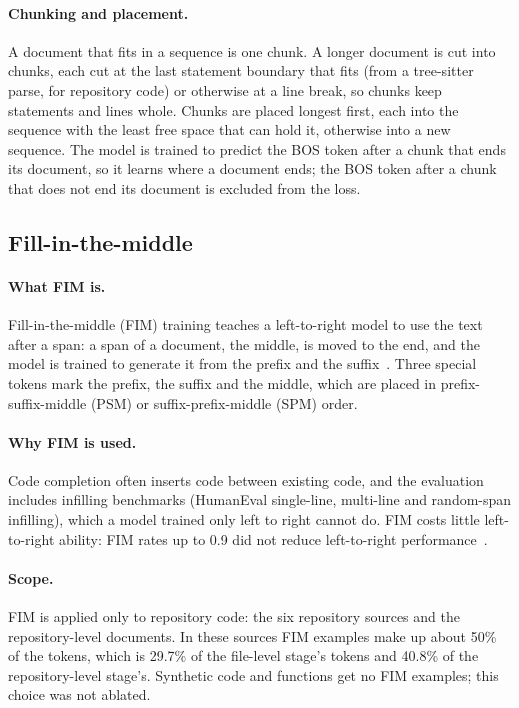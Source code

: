 \documentclass[sigconf,nonacm,balance=false]{acmart}
\begin{document}
\paragraph{Chunking and placement.} A document that fits in a sequence is one chunk. A longer document is cut into
chunks, each cut at the last statement boundary that fits (from a tree-sitter parse, for repository code) or otherwise
at a line break, so chunks keep statements and lines whole. Chunks are placed longest first, each into the sequence
with the least free space that can hold it, otherwise into a new sequence. The model is trained to predict the BOS
token after a chunk that ends its document, so it learns where a document ends; the BOS token after a chunk that does
not end its document is excluded from the loss.

\subsection{Fill-in-the-middle}
\label{sec:fim}

\paragraph{What FIM is.} Fill-in-the-middle (FIM) training teaches a left-to-right model to use the text after a span:
a span of a document, the middle, is moved to the end, and the model is trained to generate it from the prefix and
the suffix~\cite{bavarian2022fim}. Three special tokens mark the prefix, the suffix and the middle, which are placed in
prefix-suffix-middle (PSM) or suffix-prefix-middle (SPM) order.

\paragraph{Why FIM is used.} Code completion often inserts code between existing code, and the evaluation includes
infilling benchmarks (HumanEval single-line, multi-line and random-span infilling), which a model trained only left to
right cannot do. FIM costs little left-to-right ability: FIM rates up to 0.9 did not reduce left-to-right
performance~\cite{bavarian2022fim}.

\paragraph{Scope.} FIM is applied only to repository code: the six repository sources and the repository-level
documents. In these sources FIM examples make up about 50\% of the tokens, which is 29.7\% of the file-level stage's
tokens and 40.8\% of the repository-level stage's. Synthetic code and functions get no FIM examples; this choice was
not ablated.
\end{document}
